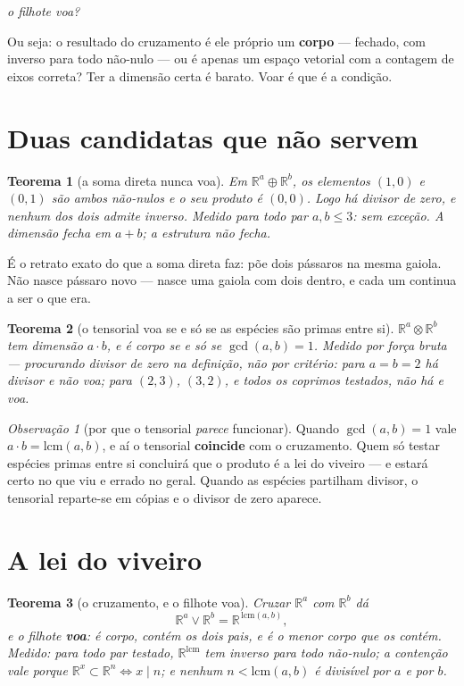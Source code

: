 \documentclass[11pt]{article}
\newcommand{\R}{\mathbb R}
\theoremstyle{plain}
\newtheorem{teorema}{Teorema}
\theoremstyle{remark}
\newtheorem{obs}{Observação}
\begin{document}
\begin{center}
\emph{o filhote voa?}
\end{center}

Ou seja: o resultado do cruzamento é ele próprio um \textbf{corpo} --- fechado, com inverso para todo
não-nulo --- ou é apenas um espaço vetorial com a contagem de eixos correta? Ter a dimensão certa é
barato. Voar é que é a condição.

\section{Duas candidatas que não servem}

\begin{teorema}[a soma direta nunca voa]
Em $\R^a\oplus\R^b$, os elementos $(1,0)$ e $(0,1)$ são ambos não-nulos e o seu produto é $(0,0)$.
Logo há divisor de zero, e nenhum dos dois admite inverso. Medido para todo par $a,b\le3$: sem
exceção. \emph{A dimensão fecha em $a+b$; a estrutura não fecha.}
\end{teorema}

\noindent É o retrato exato do que a soma direta faz: põe dois pássaros na mesma gaiola. Não nasce
pássaro novo --- nasce uma gaiola com dois dentro, e cada um continua a ser o que era.

\begin{teorema}[o tensorial voa se e só se as espécies são primas entre si]
$\R^a\otimes\R^b$ tem dimensão $a\cdot b$, e é corpo \emph{se e só se} $\gcd(a,b)=1$. Medido por
força bruta --- procurando divisor de zero na definição, não por critério: para $a=b=2$ há divisor e
não voa; para $(2,3)$, $(3,2)$, e todos os coprimos testados, não há e voa.
\end{teorema}

\begin{obs}[por que o tensorial \emph{parece} funcionar]
Quando $\gcd(a,b)=1$ vale $a\cdot b=\mathrm{lcm}(a,b)$, e aí o tensorial \textbf{coincide} com o
cruzamento. Quem só testar espécies primas entre si concluirá que o produto é a lei do viveiro --- e
estará certo no que viu e errado no geral. Quando as espécies partilham divisor, o tensorial
reparte-se em cópias e o divisor de zero aparece.
\end{obs}

\section{A lei do viveiro}

\begin{teorema}[o cruzamento, e o filhote voa]
Cruzar $\R^a$ com $\R^b$ dá
\[
  \R^a\vee\R^b=\R^{\,\mathrm{lcm}(a,b)} ,
\]
e o filhote \textbf{voa}: é corpo, contém os dois pais, e é o \emph{menor} corpo que os contém.
Medido: para todo par testado, $\R^{\mathrm{lcm}}$ tem inverso para todo não-nulo; a contenção vale
porque $\R^x\subset\R^n\iff x\mid n$; e nenhum $n<\mathrm{lcm}(a,b)$ é divisível por $a$ e por $b$.
\end{teorema}
\end{document}
